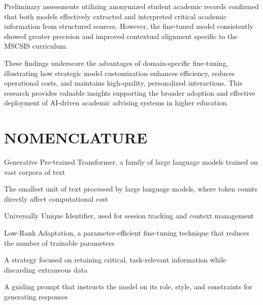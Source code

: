 \documentclass[12pt,oneside,openany]{report}
\begin{document}
Preliminary assessments utilizing anonymized student academic records confirmed that both models effectively extracted and interpreted critical academic information from structured sources. However, the fine-tuned model consistently showed greater precision and improved contextual alignment specific to the MSCSIS curriculum.

These findings underscore the advantages of domain-specific fine-tuning, illustrating how strategic model customization enhances efficiency, reduces operational costs, and maintains high-quality, personalized interactions. This research provides valuable insights supporting the broader adoption and effective deployment of AI-driven academic advising systems in higher education.

\newpage

\tableofcontents
\clearpage


\listoftables
\clearpage


\listoffigures
\clearpage





\chapter*{NOMENCLATURE}

\begin{description}[leftmargin=!,labelwidth=\widthof{\bfseries IB Fine Tuning}]

  \item[GPT]
  Generative Pre-trained Transformer, a family of large language models trained on vast corpora of text

  \item[Token]
  The smallest unit of text processed by large language models, where token counts directly affect computational cost

  \item[UUID]
  Universally Unique Identifier, used for session tracking and context management

  \item[LoRA]
  Low-Rank Adaptation, a parameter-efficient fine-tuning technique that reduces the number of trainable parameters

  \item[IB Fine Tuning]
  A strategy focused on retaining critical, task-relevant information while discarding extraneous data

  \item[Meta Prompt]
  A guiding prompt that instructs the model on its role, style, and constraints for generating responses

\end{description}
\end{document}
